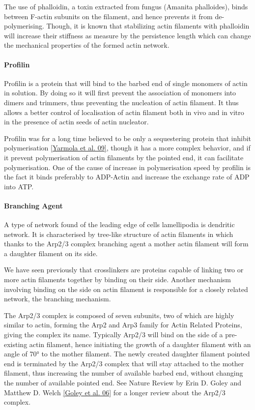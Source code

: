 \documentclass[A4paperpaper,11pt,english]{sphinxmanual}
\begin{document}
The use of phalloidin, a toxin extracted from fungus (Amanita phalloides), binds
between F-actin subunits on the filament, and hence  prevents it from
de-polymerising.  Though, it is known that stabilizing actin filaments with
phalloidin will increase their stiffness as measure by the persistence length which can change the
mechanical properties of the formed actin network.


\paragraph{Profilin}
\label{parts/part1:profilin}
Profilin is a protein that will bind to the barbed end of single monomers of
actin in solution.  By doing so it will first prevent the association of
monomers into dimers and trimmers, thus preventing the nucleation of actin
filament. It thus allows a better control of localisation of actin filament
both in vivo and in vitro in the presence of actin seeds of actin nucleator.

Profilin was for a long time believed to be only a sequestering protein
that inhibit polymerisation {\hyperref[parts/part1:yarmola2009]{{[}Yarmola et al. 09{]}}}, though it has a more complex
behavior, and if it prevent polymerisation of actin filaments by the pointed
end, it can facilitate polymerisation. One of the cause of increase in
polymerisation speed by profilin is the fact it binds preferably to ADP-Actin
and increase the exchange rate of ADP into ATP.


\paragraph{Branching Agent}
\label{parts/part1:branching-agent}
A type of network found of the leading edge of cells lamellipodia is dendritic
network. It is characterised by tree-like structure of actin filaments in which
thanks to the Arp2/3 complex branching agent a mother actin filament will form a
daughter filament on its side.

We have seen previously that crosslinkers are proteins capable of linking two
or more actin filaments together by binding on their side. Another mechanism
involving binding on the side on actin filament is responsible for a closely
related network, the branching mechanism.

The Arp2/3 complex is composed of seven subunits, two of which are highly
similar to actin, forming the Arp2 and Arp3 family for Actin Related Proteins,
giving the complex its name. Typically Arp2/3 will bind on the side of a pre-existing
actin filament, hence initiating the growth of a daughter filament with an angle of
70° to the mother filament. The newly created daughter filament pointed end
is terminated by the Arp2/3 complex that will stay attached to the mother
filament, thus increasing the number of available barbed end, without changing
the number of available pointed end. See Nature Review by Erin D. Goley and
Matthew D. Welch {\hyperref[parts/part1:goley2006]{{[}Goley et al. 06{]}}} for  a longer review about the Arp2/3
complex.
\end{document}
